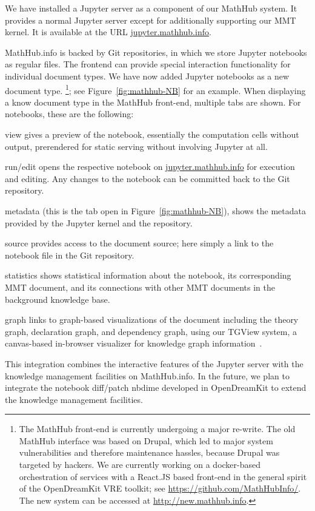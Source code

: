We have installed a Jupyter server as a component of our MathHub system.
It provides a normal Jupyter server except for additionally supporting our MMT kernel.
It is available at the URL \url{jupyter.mathhub.info}.

MathHub.info is backed by Git repositories, in which we store Jupyter notebooks as regular files.
The frontend can provide special interaction functionality for individual document types.
We have now added Jupyter notebooks as a new document type.%
\footnote{The MathHub front-end is currently undergoing a major re-write.
The old MathHub interface was based on Drupal, which led to major system vulnerabilities and therefore maintenance hassles, because Drupal was targeted by hackers.
We are currently working on a docker-based orchestration of services with a React.JS based front-end in the general spirit of the OpenDreamKit VRE toolkit; see \url{https://github.com/MathHubInfo/}. The new system can be accessed at \url{http://new.mathhub.info}.};
see Figure~\ref{fig:mathhub-NB} for an example.
When displaying a know document type in the MathHub front-end, multiple tabs are shown.
For notebooks, these are the following:
\begin{compactenum}
\item \textsf{view} gives a preview of the notebook, essentially the computation cells without output, prerendered for static serving without involving Jupyter at all.%
\item \textsf{run/edit} opens the respective notebook on \url{jupyter.mathhub.info} for execution and editing.
Any changes to the notebook can be committed back to the Git repository. 
\item \textsf{metadata} (this is the tab open in Figure~\ref{fig:mathhub-NB}), shows the metadata provided by the Jupyter kernel and the repository. 
\item \textsf{source} provides access to the document source; here simply a link to the notebook file in the Git repository.
\item \textsf{statistics} shows statistical information about the notebook, its corresponding MMT document, and its connections with other MMT documents in the background knowledge base.
\item \textsf{graph} links to graph-based visualizations of the document including the theory graph, declaration graph, and dependency graph, using our TGView system, a canvas-based in-browser visualizer for knowledge graph information~\cite{RupKohMue:fitgv17}.
\end{compactenum}
This integration combines the interactive features of the Jupyter server with the knowledge management facilities on MathHub.info. In the future, we plan to integrate the notebook diff/patch \textsf{nbdime} developed in OpenDreamKit to extend the knowledge management facilities. 


